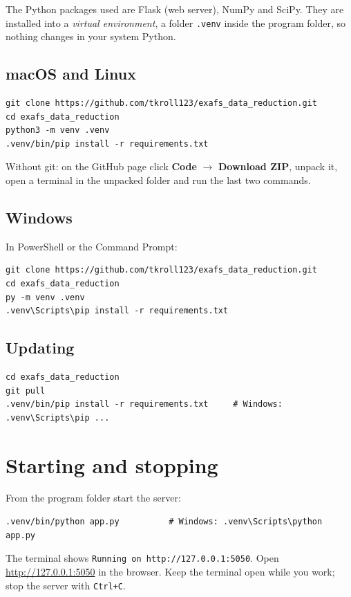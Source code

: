 \documentclass[11pt,a4paper]{article}
\newcommand{\ui}[1]{\textsf{\textbf{#1}}}          %
\newcommand{\file}[1]{\texttt{#1}}
\begin{document}
The Python packages used are Flask (web server), NumPy and SciPy. They are
installed into a \emph{virtual environment}, a folder \file{.venv} inside the
program folder, so nothing changes in your system Python.

\subsection{macOS and Linux}
\begin{shell}
\begin{Verbatim}
git clone https://github.com/tkroll123/exafs_data_reduction.git
cd exafs_data_reduction
python3 -m venv .venv
.venv/bin/pip install -r requirements.txt
\end{Verbatim}
\end{shell}
Without git: on the GitHub page click \ui{Code} $\to$ \ui{Download ZIP}, unpack it,
open a terminal in the unpacked folder and run the last two commands.

\subsection{Windows}
In PowerShell or the Command Prompt:
\begin{shell}
\begin{Verbatim}
git clone https://github.com/tkroll123/exafs_data_reduction.git
cd exafs_data_reduction
py -m venv .venv
.venv\Scripts\pip install -r requirements.txt
\end{Verbatim}
\end{shell}

\subsection{Updating}
\begin{shell}
\begin{Verbatim}
cd exafs_data_reduction
git pull
.venv/bin/pip install -r requirements.txt     # Windows: .venv\Scripts\pip ...
\end{Verbatim}
\end{shell}

\section{Starting and stopping}
From the program folder start the server:
\begin{shell}
\begin{Verbatim}
.venv/bin/python app.py          # Windows: .venv\Scripts\python app.py
\end{Verbatim}
\end{shell}
The terminal shows \texttt{Running on http://127.0.0.1:5050}. Open
\url{http://127.0.0.1:5050} in the browser. Keep the terminal open while you
work; stop the server with \texttt{Ctrl+C}.
\end{document}
